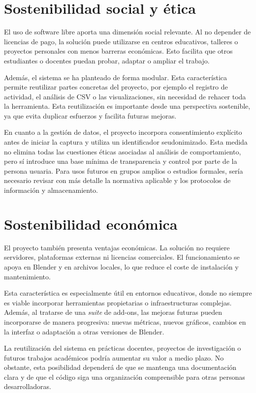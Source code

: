 \section{Sostenibilidad social y ética}

El uso de software libre aporta una dimensión social relevante. Al no depender de licencias de pago, la solución puede utilizarse en centros educativos, talleres o proyectos personales con menos barreras económicas. Esto facilita que otros estudiantes o docentes puedan probar, adaptar o ampliar el trabajo.

Además, el sistema se ha planteado de forma modular. Esta característica permite reutilizar partes concretas del proyecto, por ejemplo el registro de actividad, el análisis de CSV o las visualizaciones, sin necesidad de rehacer toda la herramienta. Esta reutilización es importante desde una perspectiva sostenible, ya que evita duplicar esfuerzos y facilita futuras mejoras.

En cuanto a la gestión de datos, el proyecto incorpora consentimiento explícito antes de iniciar la captura y utiliza un identificador seudonimizado. Esta medida no elimina todas las cuestiones éticas asociadas al análisis de comportamiento, pero sí introduce una base mínima de transparencia y control por parte de la persona usuaria. Para usos futuros en grupos amplios o estudios formales, sería necesario revisar con más detalle la normativa aplicable y los protocolos de información y almacenamiento.

\section{Sostenibilidad económica}

El proyecto también presenta ventajas económicas. La solución no requiere servidores, plataformas externas ni licencias comerciales. El funcionamiento se apoya en Blender y en archivos locales, lo que reduce el coste de instalación y mantenimiento.

Esta característica es especialmente útil en entornos educativos, donde no siempre es viable incorporar herramientas propietarias o infraestructuras complejas. Además, al tratarse de una \textit{suite} de add-ons, las mejoras futuras pueden incorporarse de manera progresiva: nuevas métricas, nuevos gráficos, cambios en la interfaz o adaptación a otras versiones de Blender.

La reutilización del sistema en prácticas docentes, proyectos de investigación o futuros trabajos académicos podría aumentar su valor a medio plazo. No obstante, esta posibilidad dependerá de que se mantenga una documentación clara y de que el código siga una organización comprensible para otras personas desarrolladoras.


